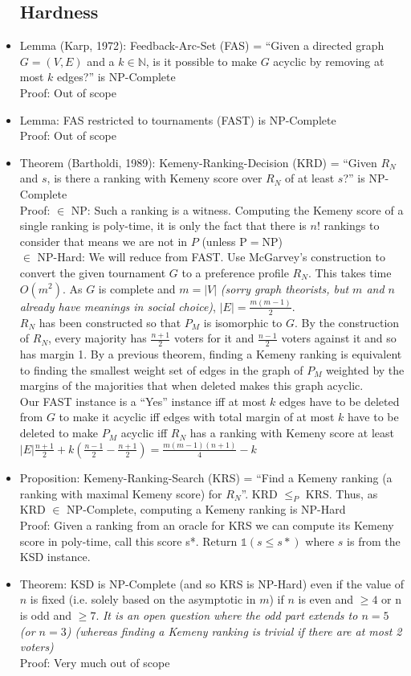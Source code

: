 \documentclass[20pt,a4paper,landscape]{extarticle}
\begin{document}
\begin{flushleft}
\begin{itemize}
\subsection{Hardness}
\item Lemma (Karp, 1972): Feedback-Arc-Set (FAS) = ``Given a directed graph $G=(V,E)$ and a $k \in \mathbb{N}$, is it possible to make $G$ acyclic by removing at most $k$ edges?'' is NP-Complete\\
Proof: Out of scope
\item Lemma: FAS restricted to tournaments (FAST) is NP-Complete\\
Proof: Out of scope
\item Theorem (Bartholdi, 1989): Kemeny-Ranking-Decision (KRD) = ``Given $R_N$ and $s$, is there a ranking with Kemeny score over $R_N$ of at least $s$?'' is NP-Complete\\
Proof: $\in$ NP: Such a ranking is a witness. Computing the Kemeny score of a single ranking is poly-time, it is only the fact that there is $n!$ rankings to consider that means we are not in $P$ (unless P$=$NP)\\
$\in$ NP-Hard: We will reduce from FAST. Use McGarvey's construction to convert the given tournament $G$ to a preference profile $R_N$. This takes time $O(m^2)$. As $G$ is complete and $m = |V|$ \textit{(sorry graph theorists, but $m$ and $n$ already have meanings in social choice)}, $|E| = \frac{m(m-1)}{2}$.\\
$R_N$ has been constructed so that $P_M$ is isomorphic to $G$. By the construction of $R_N$, every majority has $\frac{n+1}{2}$ voters for it and $\frac{n-1}{2}$ voters against it and so has margin 1. By a previous theorem, finding a Kemeny ranking is equivalent to finding the smallest weight set of edges in the graph of $P_M$ weighted by the margins of the majorities that when deleted makes this graph acyclic.\\
Our FAST instance is a ``Yes'' instance iff at most $k$ edges have to be deleted from $G$ to make it acyclic iff edges with total margin of at most $k$ have to be deleted to make $P_M$ acyclic iff $R_N$ has a ranking with Kemeny score at least $|E|\frac{n+1}{2} + k(\frac{n-1}{2}-\frac{n+1}{2}) = \frac{m(m-1)(n+1)}{4}-k$
\item Proposition: Kemeny-Ranking-Search (KRS) = ``Find a Kemeny ranking (a ranking with maximal Kemeny score) for $R_N$''. KRD $\leq_P$ KRS. Thus, as KRD $\in$ NP-Complete, computing a Kemeny ranking is NP-Hard\\
Proof: Given a ranking from an oracle for KRS we can compute its Kemeny score in poly-time, call this score s*. Return $\mathds{1}(s \leq s*)$ where $s$ is from the KSD instance.
\item Theorem: KSD is NP-Complete (and so KRS is NP-Hard) even if the value of $n$ is fixed (i.e. solely based on the asymptotic in $m$) if $n$ is even and $\geq 4$ or n is odd and $\geq 7$. \textit{It is an open question where the odd part extends to $n=5$ (or $n=3$) (whereas finding a Kemeny ranking is trivial if there are at most 2 voters)} \\
Proof: Very much out of scope
\end{itemize}
\clearpage

\end{flushleft}
\end{document}
